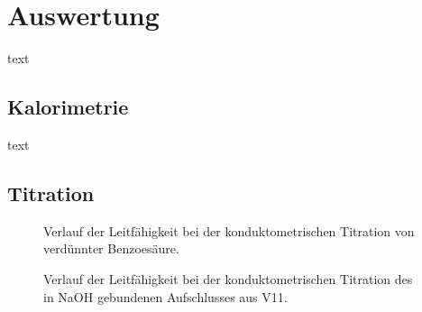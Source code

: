 \chapter{Auswertung}
	text
	\section{Kalorimetrie}
		text
	\section{Titration}
		\begin{figure}[h]
			\centering
			
			\caption[Verlauf der Leitfähigkeit verdünnter Benzoesäure]{Verlauf der Leitfähigkeit bei der konduktometrischen Titration von verdünnter Benzoesäure.}
			\label{fig:verlauf leitf benzo}
		\end{figure}
		\begin{figure}[h]
			\centering
			
			\caption[Verlauf der Leitfähigkeit des Aufschlusses]{Verlauf der Leitfähigkeit bei der konduktometrischen Titration des in NaOH gebundenen Aufschlusses aus V11.}
			\label{fig:verlauf leitf aufschluss}
		\end{figure}